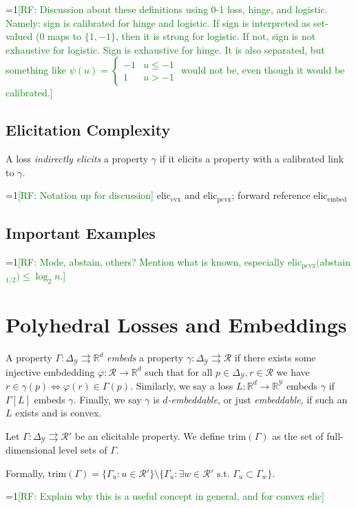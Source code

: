 \documentclass[11pt]{colt2019}
\newcommand{\Comments}{1}
\newcommand{\mynote}[2]{\ifnum\Comments=1\textcolor{#1}{#2}\fi}
\newcommand{\raf}[1]{\mynote{green}{[RF: #1]}}
\newcommand{\reals}{\mathbb{R}}
\newcommand{\prop}[1]{\Gamma[#1]}
\newcommand{\eliccvx}{\mathrm{elic}_\mathrm{cvx}}
\newcommand{\elicpoly}{\mathrm{elic}_\mathrm{pcvx}}
\newcommand{\elicembed}{\mathrm{elic}_\mathrm{embed}}
\newcommand{\simplex}{\Delta_\Y}
\newcommand{\R}{\mathcal{R}}
\newcommand{\Y}{\mathcal{Y}}
\newcommand{\toto}{\rightrightarrows}
\newcommand{\trim}{\mathrm{trim}}
\begin{document}
\raf{Discussion about these definitions using 0-1 loss, hinge, and logistic.  Namely: sign is calibrated for hinge and logistic.  If sign is interpreted as set-valued (0 maps to $\{1,-1\}$, then it is strong for logistic.  If not, sign is not exhaustive for logistic.  Sign is exhaustive for hinge.  It is also separated, but something like $\psi(u) =
  \begin{cases}
    -1 & u \leq -1\\
    1 & u > -1
  \end{cases}$
  would not be, even though it would be calibrated.}


\subsection{Elicitation Complexity}

\begin{definition}
  A loss \emph{indirectly elicits} a property $\gamma$ if it elicits a property with a calibrated link to $\gamma$.
\end{definition}

\raf{Notation up for discussion}
$\eliccvx$ and $\elicpoly$; forward reference $\elicembed$

\subsection{Important Examples}
\raf{Mode, abstain, others?  Mention what is known, especially $\elicpoly($abstain$_{1/2}) \leq \log_2 n$.}

\section{Polyhedral Losses and Embeddings}

\begin{definition}
  A property $\Gamma : \simplex \toto \reals^d$ \emph{embeds} a property $\gamma : \simplex \toto \R$ if there exists some injective embdedding $\varphi:\R\to\reals^d$ such that for all $p\in\simplex,r\in\R$ we have $r \in \gamma(p) \iff \varphi(r) \in \Gamma(p)$.
  Similarly, we say a loss $L:\reals^d\to\reals^\Y$ embeds $\gamma$ if $\prop{L}$ embeds $\gamma$.
  Finally, we say $\gamma$ is \emph{$d$-embeddable}, or just \emph{embeddable}, if such an $L$ exists and is convex.
\end{definition}

\begin{definition}\label{def:trim}
  Let $\Gamma:\simplex \toto\R'$ be an elicitable property.
  We define $\trim(\Gamma)$ as the set of full-dimensional level sets of $\Gamma$.
  
  Formally, $\trim(\Gamma) = \{\Gamma_u : u \in \R'\} \setminus \{ \Gamma_u : \exists w \in \R' \text{ s.t. } \Gamma_u \subset \Gamma_w \}$.
\end{definition}
\raf{Explain why this is a useful concept in general, and for convex elic}  
\end{document}
